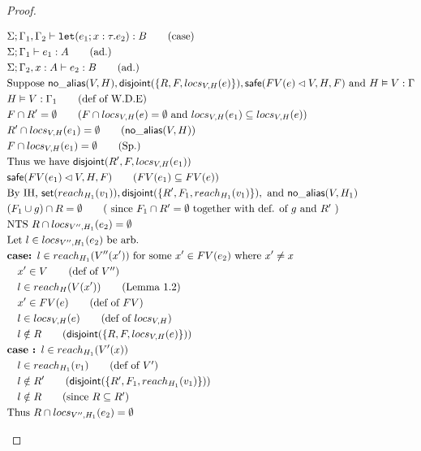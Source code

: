 \documentclass[11pt]{article}
\newcommand{\ms}[1]{\ensuremath{\mathsf{#1}}}
\newcommand{\irl}[1]{\mathtt{#1}}
\newcommand{\na}[1]{\mathsf{no\_alias}(#1)}
\newcommand{\safe}[1]{\mathsf{safe}(#1)}
\newcommand{\dist}[1]{\mathsf{disjoint}(#1)}
\begin{document}
\begin{proof}
\begin{description}
\begin{align*}
  &\Sigma; \Gamma_1,\Gamma_2 \vdash \irl{let}(e_1; x : \tau.e_2) : B \tag{case}\\
  &\Sigma; \Gamma_1 \vdash e_1 : A \tag{ad.}\\
  &\Sigma; \Gamma_2, x : A \vdash e_2 : B \tag{ad.}\\
  &\text{Suppose } \na{V,H}, \dist{\{R,F,locs_{V,H}(e)\}}, \safe{FV(e) \lhd V,H,F} \text{ and } H \vDash V : \Gamma\\
  &H \vDash V : \Gamma_1 \tag{def of W.D.E}\\
  &F \cap R' = \emptyset \tag{$F \cap locs_{V,H}(e) = \emptyset$ and $locs_{V,H}(e_1) \subseteq locs_{V,H}(e)$}\\
  &R' \cap locs_{V,H}(e_1) = \emptyset \tag{$\na{V,H}$}\\
  &F \cap locs_{V,H}(e_1) = \emptyset \tag{Sp.}\\
  &\text{Thus we have } \dist{R',F,locs_{V,H}(e_1)}\\
  &\safe{FV(e_1) \lhd V,H,F} \tag{$FV(e_1) \subseteq FV(e)$}\\
  &\text{By IH, } \ms{set}(reach_{H_1}(v_1)), \dist{\{R',F_1,reach_{H_1}(v_1)\}}, \text{ and } \na{V,H_1}\\
  &(F_1 \cup g) \cap R = \emptyset \tag{ since  $F_1 \cap R' = \emptyset$ together with def. of $g$ and $R'$ }\\
  &\text{NTS } R \cap locs_{V'',H_1}(e_2) = \emptyset\\
  &\text{Let } l \in locs_{V'',H_1}(e_2) \text{ be arb.}\\
  &\textbf{case: } l \in reach_{H_1}(V''(x')) \text{ for some $x' \in FV(e_2)$ where } x' \ne x\\
  &\quad x' \in V \tag{def of $V''$}\\
  &\quad l \in reach_{H}(V(x')) \tag{Lemma 1.2}\\
  &\quad x' \in FV(e) \tag{def of $FV$}\\
  &\quad l \in locs_{V,H}(e) \tag{def of $locs_{V,H}$}\\
  &\quad l \notin R \tag{$\dist{\{R,F,locs_{V,H}(e)\}}$}\\
  &\textbf{case : } l \in reach_{H_1}(V'(x))\\
  &\quad l \in reach_{H_1}(v_1) \tag{def of $V'$}\\
  &\quad l \notin R' \tag{$\dist{\{R',F_1,reach_{H_1}(v_1)\}}$}\\
  &\quad l \notin R \tag{since  $R \subseteq R'$}\\
  &\text{Thus }  R \cap locs_{V'',H_1}(e_2) = \emptyset\\

\end{align*}
\end{description}
\end{proof}
\end{document}
